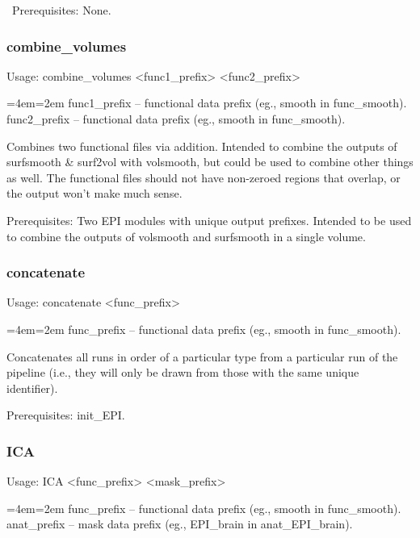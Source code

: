 \documentclass[final,titlepage,letterpaper,oneside,12pt]{article}
\renewcommand{\texttt}[2][BrickRed]{\textcolor{#1}{\ttfamily #2}}%
\newenvironment{blockquote}{%
  \par%
  \medskip
  \leftskip=4em\rightskip=2em%
  \noindent\ignorespaces}{%
  \par\medskip}
\begin{document}
\
Prerequisites: None.

\subsubsection{combine\_volumes}
Usage: \texttt{combine\_volumes <func1\_prefix> <func2\_prefix>}

\begin{blockquote}
func1\_prefix -- functional data prefix (eg., smooth in func\_smooth).
func2\_prefix -- functional data prefix (eg., smooth in func\_smooth).
\end{blockquote}

\noindent Combines two functional files via addition. Intended to combine the outputs of \texttt{surfsmooth} \& \texttt{surf2vol} with \texttt{volsmooth}, but could be used to combine other things as well. The functional files should not have non-zeroed regions that overlap, or the output won't make much sense.

Prerequisites: Two EPI modules with unique output prefixes. Intended to be used to combine the outputs of \texttt{volsmooth} and \texttt{surfsmooth} in a single volume. 

\subsubsection{concatenate}
Usage: \texttt{concatenate <func\_prefix>}

\begin{blockquote}
func\_prefix -- functional data prefix (eg., smooth in func\_smooth).
\end{blockquote}

\noindent Concatenates all runs in order of a particular type from a particular run of the pipeline (i.e., they will only be drawn from those with the same unique identifier).

Prerequisites: \texttt{init\_EPI}.

\subsubsection{ICA}
Usage: \texttt{ICA <func\_prefix> <mask\_prefix>}

\begin{blockquote}
func\_prefix -- functional data prefix (eg., smooth in func\_smooth).
anat\_prefix -- mask data prefix (eg., EPI\_brain in anat\_EPI\_brain).
\end{blockquote}
\end{document}
